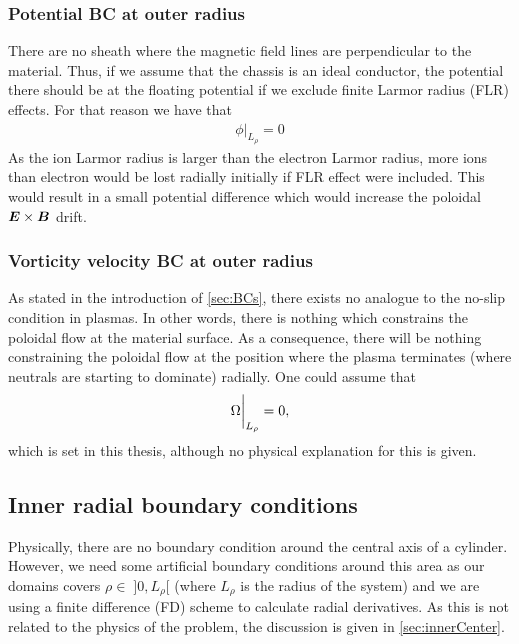 \subsubsection{Potential BC at outer radius}
%
There are no sheath where the magnetic field lines are perpendicular to the material.
Thus, if we assume that the chassis is an ideal conductor, the potential there should be at the floating potential if we exclude finite Larmor radius (FLR) effects.
For that reason we have that
%
\begin{align*}
    \phi \bigg|_{L_\rho} = 0
\end{align*}
%
As the ion Larmor radius is larger than the electron Larmor radius, more ions than electron would be lost radially initially if FLR effect were included.
This would result in a small potential difference which would increase the poloidal $\boldsymbol{E}\times\boldsymbol{B}$ drift.

\subsubsection{Vorticity velocity BC at outer radius}
%
%
As stated in the introduction of \cref{sec:BCs}, there exists no analogue to the no-slip condition in plasmas.
In other words, there is nothing which constrains the poloidal flow at the material surface.
As a consequence, there will be nothing constraining the poloidal flow at the position where the plasma terminates (where neutrals are starting to dominate) radially.
One could assume that
%
\begin{align*}
    \Omega \bigg|_{L_\rho} = 0,
\end{align*}
%
which is set in this thesis, although no physical explanation for this is given.

\subsection{Inner radial boundary conditions}
\label{sec:BCInnerRho}
%
Physically, there are no boundary condition around the central axis of a cylinder.
However, we need some artificial boundary conditions around this area as our domains covers $\rho \in \; ]0, L_\rho[$ (where $L_\rho$ is the radius of the system) and we are using a finite difference (FD) scheme to calculate radial derivatives.
As this is not related to the physics of the problem, the discussion is given in \cref{sec:innerCenter}.
